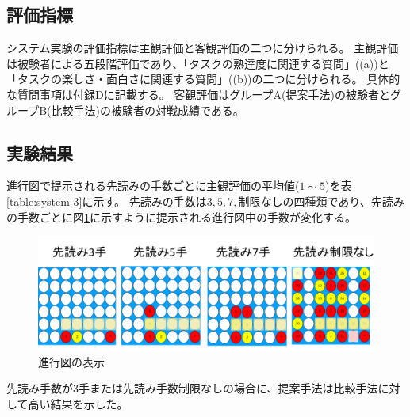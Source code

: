 \subsection{評価指標}
システム実験の評価指標は主観評価と客観評価の二つに分けられる。
主観評価は被験者による五段階評価であり、「タスクの熟達度に関連する質問」((a))と「タスクの楽しさ・面白さに関連する質問」((b))の二つに分けられる。
具体的な質問事項は付録Dに記載する。
客観評価はグループA(提案手法)の被験者とグループB(比較手法)の被験者の対戦成績である。

\subsection{実験結果}
進行図で提示される先読みの手数ごとに主観評価の平均値($1\sim5$)を表\ref{table:system-3}に示す。
先読みの手数は${3, 5, 7, \textrm{制限なし}}$の四種類であり、先読みの手数ごとに図\ref{fig:see}に示すように提示される進行図中の手数が変化する。
\begin{figure}[t]
    \centering
    \includegraphics[width=\linewidth]{./figure/see.png}
	\caption{進行図の表示}
	\label{fig:see}
\end{figure}
先読み手数が3手または先読み手数制限なしの場合に、提案手法は比較手法に対して高い結果を示した。
\begin{table}[H]
    \caption{先読み手数３手の場合}
    \scriptsize
    \centering
    \label{table:system-3}
\end{table}
